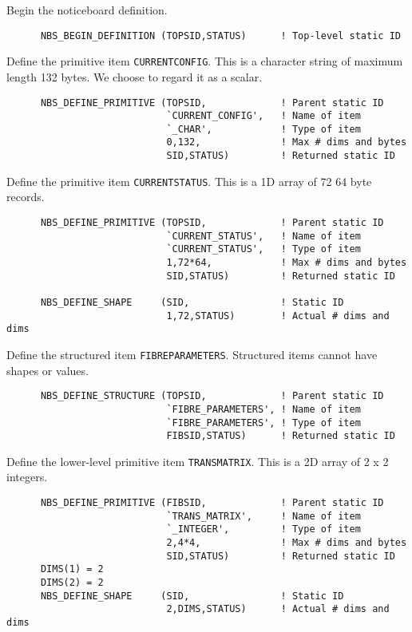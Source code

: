 \documentclass[twoside,11pt]{article}
\renewcommand{\_}{\texttt{\symbol{95}}}
\begin{document}
Begin the noticeboard definition.

\begin {verbatim}
      NBS_BEGIN_DEFINITION (TOPSID,STATUS)      ! Top-level static ID
\end{verbatim}

Define the primitive item {\tt CURRENT\_CONFIG}. This is a character string
of maximum length 132 bytes. We choose to regard it as a scalar.

\begin {verbatim}
      NBS_DEFINE_PRIMITIVE (TOPSID,             ! Parent static ID
                            `CURRENT_CONFIG',   ! Name of item
                            `_CHAR',            ! Type of item
                            0,132,              ! Max # dims and bytes
                            SID,STATUS)         ! Returned static ID
\end{verbatim}

Define the primitive item {\tt CURRENT\_STATUS}. This is a 1D array of 72 64
byte records.

\begin {verbatim}
      NBS_DEFINE_PRIMITIVE (TOPSID,             ! Parent static ID
                            `CURRENT_STATUS',   ! Name of item
                            `CURRENT_STATUS',   ! Type of item
                            1,72*64,            ! Max # dims and bytes
                            SID,STATUS)         ! Returned static ID

      NBS_DEFINE_SHAPE     (SID,                ! Static ID
                            1,72,STATUS)        ! Actual # dims and dims
\end{verbatim}

Define the structured item {\tt FIBRE\_PARAMETERS}. Structured items cannot
have shapes or values.

\begin {verbatim}
      NBS_DEFINE_STRUCTURE (TOPSID,             ! Parent static ID
                            `FIBRE_PARAMETERS', ! Name of item
                            `FIBRE_PARAMETERS', ! Type of item
                            FIBSID,STATUS)      ! Returned static ID
\end{verbatim}

Define the lower-level primitive item {\tt TRANS\_MATRIX}. This is a 2D array
of 2 x 2 integers.

\begin {verbatim}
      NBS_DEFINE_PRIMITIVE (FIBSID,             ! Parent static ID
                            `TRANS_MATRIX',     ! Name of item
                            `_INTEGER',         ! Type of item
                            2,4*4,              ! Max # dims and bytes
                            SID,STATUS)         ! Returned static ID
      DIMS(1) = 2
      DIMS(2) = 2
      NBS_DEFINE_SHAPE     (SID,                ! Static ID
                            2,DIMS,STATUS)      ! Actual # dims and dims
\end{verbatim}
\end{document}
